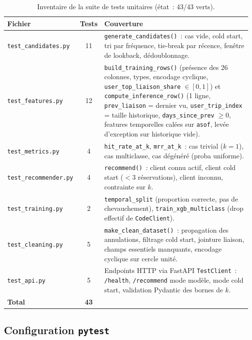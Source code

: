 \documentclass[11pt, a4paper]{article}
\begin{document}
\begin{table}[h]
\centering
\small
\begin{tabularx}{\textwidth}{|l|c|X|}
\hline
\textbf{Fichier} & \textbf{Tests} & \textbf{Couverture} \\
\hline
\texttt{test\_candidates.py} & 11 &
  \texttt{generate\_candidates()}~: cas vide, cold start,
  tri par fréquence, tie-break par récence, fenêtre de lookback,
  dédoublonnage. \\
\hline
\texttt{test\_features.py}    & 12 &
  \texttt{build\_training\_rows()} (présence des 26 colonnes,
  types, encodage cyclique, \texttt{user\_top\_liaison\_share}
  $\in [0,1]$) et \texttt{compute\_inference\_row()} (1 ligne,
  \texttt{prev\_liaison} = dernier vu, \texttt{user\_trip\_index}
  = taille historique, \texttt{days\_since\_prev} $\geq 0$,
  features temporelles calées sur \texttt{asof}, levée
  d'exception sur historique vide). \\
\hline
\texttt{test\_metrics.py}     & 4  &
  \texttt{hit\_rate\_at\_k}, \texttt{mrr\_at\_k}~: cas trivial
  ($k=1$), cas multiclasse, cas dégénéré (proba uniforme). \\
\hline
\texttt{test\_recommender.py} & 4  &
  \texttt{recommend()}~: client connu actif, client cold start
  ($< 3$ réservations), client inconnu, contrainte sur $k$. \\
\hline
\texttt{test\_training.py}    & 2  &
  \texttt{temporal\_split} (proportion correcte, pas de
  chevauchement), \texttt{train\_xgb\_multiclass} (drop effectif
  de \texttt{CodeClient}). \\
\hline
\texttt{test\_cleaning.py}    & 5  &
  \texttt{make\_clean\_dataset()}~: propagation des annulations,
  filtrage cold start, jointure liaison, champs essentiels manquants,
  encodage cyclique sur cercle unité. \\
\hline
\texttt{test\_api.py}         & 5  &
  Endpoints HTTP via FastAPI \texttt{TestClient}~: \texttt{/health},
  \texttt{/recommend} mode modèle, mode cold start, validation
  Pydantic des bornes de $k$. \\
\hline
\textbf{Total}                & \textbf{43} & \\
\hline
\end{tabularx}
\caption{Inventaire de la suite de tests unitaires (état~:
43/43 verts).}
\end{table}

\subsection{Configuration \texttt{pytest}}
\end{document}
